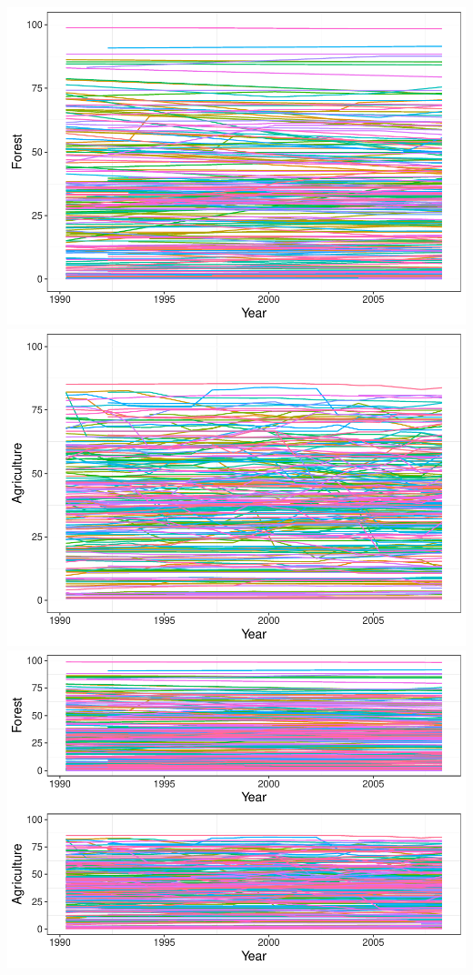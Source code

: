 \documentclass[12pt,]{article}
\begin{document}
\includegraphics{Marx_ENV872_Project_files/figure-latex/unnamed-chunk-3-1.pdf}
\includegraphics{Marx_ENV872_Project_files/figure-latex/unnamed-chunk-3-2.pdf}
\includegraphics{Marx_ENV872_Project_files/figure-latex/unnamed-chunk-3-3.pdf}
\end{document}

